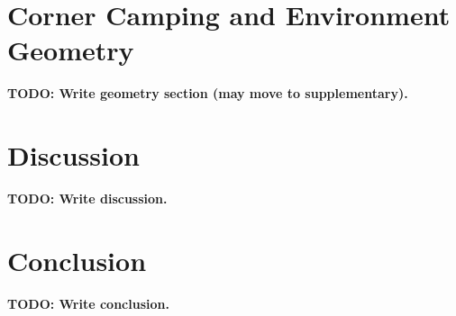 \documentclass[letterpaper]{article}
\begin{document}
\section{Corner Camping and Environment Geometry}
\label{sec:geometry}


\textbf{TODO: Write geometry section (may move to supplementary).}

\section{Discussion}
\label{sec:discussion}


\textbf{TODO: Write discussion.}

\section{Conclusion}
\label{sec:conclusion}

\textbf{TODO: Write conclusion.}



\end{document}
